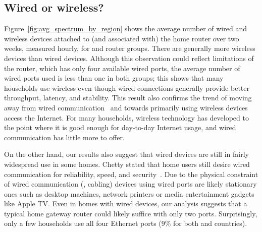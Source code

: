 



\subsection{Wired or wireless?}

Figure~\ref{fig:avg_spectrum_by_region} shows the average number of wired and wireless
devices attached to (and associated with) the home router 
over two
weeks, measured hourly, for \developed{} and \developing{} router groups. 
There are generally more wireless devices than wired devices.
Although this observation could reflect limitations of the router, which has only four available wired ports,
  the average number of wired ports used is
less than one in both groups; this shows that many households use wireless
even though wired connections generally
provide better throughput, latency, and stability.  This result also confirms the trend of moving away from wired
communication~\cite{www-itu} and towards primarily using wireless devices access the
Internet. For many households, wireless technology has
developed to the point where it is good enough for day-to-day Internet usage, and wired communication has little more to offer.

On the other hand, our results also suggest that wired devices are still in fairly widespread
use in some homes.  Chetty \ea stated that home users still desire wired communication
for reliability, speed, and security~\cite{Chetty:2007:SHL}.  Due
to the physical constraint of wired communication (\ie, 
cabling) devices using wired ports are likely stationary ones such as
desktop machines, network printers or media entertainment gadgets like
Apple TV. Even in homes with wired devices, our analysis suggests that a typical home gateway router
could likely suffice with only two ports. Surprisingly, only a few
households use all four Ethernet ports (9\% for both \developed{} and \developing{}
countries).


